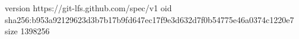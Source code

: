version https://git-lfs.github.com/spec/v1
oid sha256:b953a92129623d3b7b17b9fd647ec17f9e3d632d7f0b54775e46a0374c1220e7
size 1398256
